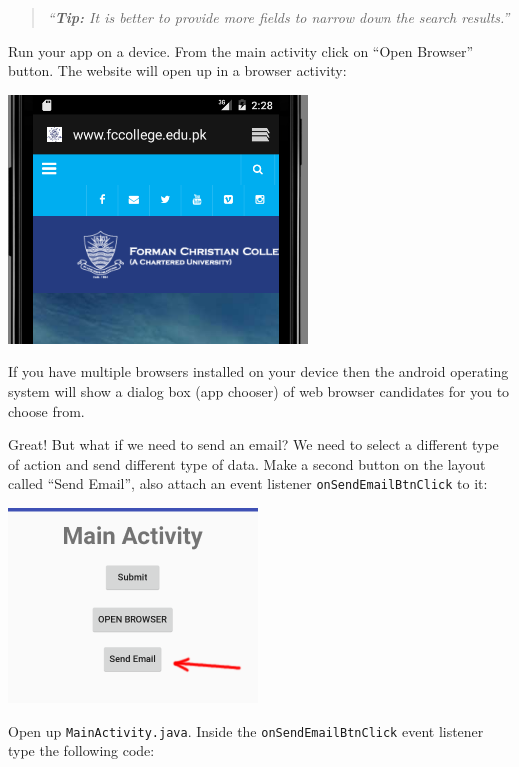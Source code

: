 \begin{quote}
	\textit{``\textbf{Tip:} It is better to provide more fields to narrow down the search results.''}
\end{quote}

Run your app on a device. From the main activity click on ``Open Browser'' button. The website will open up in a browser activity:

\begin{center}
	\includegraphics[scale=0.4]{chapters/ch09/images/24}
\end{center}

If you have multiple browsers installed on your device then the android operating system will show a dialog box (app chooser) of web browser candidates for you to choose from.

Great! But what if we need to send an email? We need to select a different type of action and send different type of data. Make a second button on the layout called ``Send Email'', also attach an event listener \texttt{onSendEmailBtnClick} to it:

\begin{center}
	\includegraphics[scale=0.4]{chapters/ch09/images/26}
\end{center}

Open up \texttt{MainActivity.java}. Inside the \texttt{onSendEmailBtnClick} event listener type the following code:

